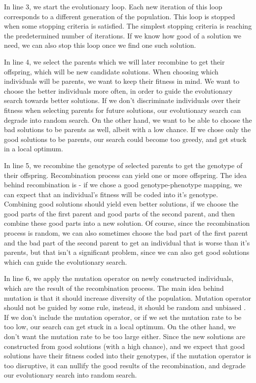 In line 3, we start the evolutionary loop. Each new iteration of this loop corresponds to a different generation of the population. This loop is stopped when some stopping criteria is satisfied. The simplest stopping criteria is reaching the predetermined number of iterations. If we know how good of a solution we need, we can also stop this loop once we find one such solution.  

In line 4, we select the parents which we will later recombine to get their offspring, which will be new candidate solutions. When choosing which individuals will be parents, we want to keep their fitness in mind. We want to choose the better individuals more often, in order to guide the evolutionary search towards better solutions. If we don't discriminate individuals over their fitness when selecting parents for future solutions, our evolutionary search can degrade into random search. On the other hand, we want to be able to choose the bad solutions to be parents as well, albeit with a low chance. If we chose only the good solutions to be parents, our search could become too greedy, and get stuck in a local optimum.

In line 5, we recombine the genotype of selected parents to get the genotype of their offspring. Recombination process can yield one or more offspring. The idea behind recombination is - if we chose a good genotype-phenotype mapping, we can expect that an individual's fitness will be coded into it's genotype. Combining good solutions should yield even better solutions, if we choose the good parts of the first parent and good parts of the second parent, and then combine these good parts into a new solution. Of course, since the recombination process is random, we can also sometimes choose the bad part of the first parent and the bad part of the second parent to get an individual that is worse than it's parents, but that isn't a significant problem, since we can also get good solutions which can guide the evolutionary search.

In line 6, we apply the mutation operator on newly constructed individuals, which are the result of the recombination process. The main idea behind mutation is that it should increase diversity of the population. Mutation operator should not be guided by some rule, instead, it should be random and unbiased \citep{eiben2015evolutionarycomputing}. If we don't include the mutation operator, or if we set the mutation rate to be too low, our search can get stuck in a local optimum. On the other hand, we don't want the mutation rate to be too large either. Since the new solutions are constructed from good solutions (with a high chance), and we expect that good solutions have their fitness coded into their genotypes, if the mutation operator is too disruptive, it can nullify the good results of the recombination, and degrade our evolutionary search into random search. 

